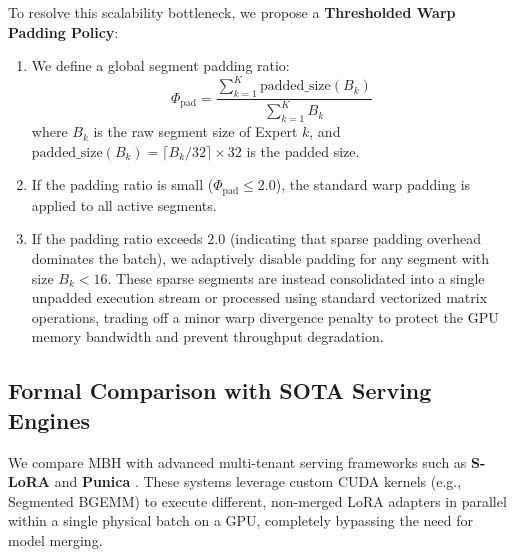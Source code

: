 \documentclass{article}
\theoremstyle{plain}
\theoremstyle{definition}
\theoremstyle{remark}
\begin{document}
\begin{enumerate}
    To resolve this scalability bottleneck, we propose a \textbf{Thresholded Warp Padding Policy}:
    \begin{enumerate}
        \item We define a global segment padding ratio:
        \begin{equation}
        \Phi_{\text{pad}} = \frac{\sum_{k=1}^K \text{padded\_size}(B_k)}{\sum_{k=1}^K B_k}
        \end{equation}
        where $B_k$ is the raw segment size of Expert $k$, and $\text{padded\_size}(B_k) = \lceil B_k / 32 \rceil \times 32$ is the padded size.
        \item If the padding ratio is small ($\Phi_{\text{pad}} \le 2.0$), the standard warp padding is applied to all active segments.
        \item If the padding ratio exceeds $2.0$ (indicating that sparse padding overhead dominates the batch), we adaptively disable padding for any segment with size $B_k < 16$. These sparse segments are instead consolidated into a single unpadded execution stream or processed using standard vectorized matrix operations, trading off a minor warp divergence penalty to protect the GPU memory bandwidth and prevent throughput degradation.
    \end{enumerate}
\end{enumerate}

\subsection{Formal Comparison with SOTA Serving Engines}
We compare MBH with advanced multi-tenant serving frameworks such as \textbf{S-LoRA} \cite{SLoRA2024} and \textbf{Punica} \cite{Punica2023}. These systems leverage custom CUDA kernels (e.g., Segmented BGEMM) to execute different, non-merged LoRA adapters in parallel within a single physical batch on a GPU, completely bypassing the need for model merging.
\end{document}
